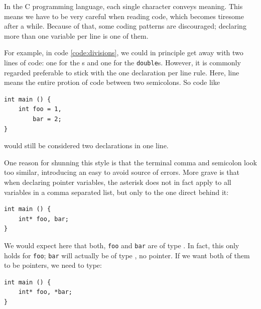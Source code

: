 {{{{\begin{hintbox}
In the C programming language, each single character conveys meaning. This means we have to be very careful when reading code, which becomes tiresome after a while. Because of that, some coding patterns are discouraged; declaring more than one variable per line is one of them.

For example, in code \ref{code:divisions}, we could in principle get away with two lines of code: one for the s and one for the \texttt{double}s. However, it is commonly regarded preferable to stick with the one declaration per line rule. Here, line means the entire protion of code between two semicolons. So code like

\begin{warnbox}[Two Declarations in one line, leftupper=7mm]
\begin{verbatim}
int main () {
    int foo = 1,
        bar = 2;
}
\end{verbatim}
\end{warnbox}
would still be considered two declarations in one line.
\end{hintbox}
%
\begin{hintbox}[]
One reason for shunning this style is that the terminal comma and semicolon look too similar, introducing an easy to avoid source of errors. More grave is that when declaring pointer variables, the asterisk does not in fact apply to all variables in a comma separated list, but only to the one direct behind it:

\vspace{6pt}
\begin{warnbox}[Spurious declaration of pointers, leftupper=7mm]
\begin{verbatim}
int main () {
    int* foo, bar;
}
\end{verbatim}
\end{warnbox}

We would expect here that both, \texttt{foo} and \texttt{bar} are of type . In fact, this only holds for \texttt{foo}; \texttt{bar} will actually be of type , \ie no pointer. If we want both of them to be pointers, we need to type:
\begin{warnbox}[Spurious declaration of pointers, leftupper=7mm]
\begin{verbatim}
int main () {
    int* foo, *bar;
}
\end{verbatim}
\end{warnbox}


\end{hintbox}}}}}
